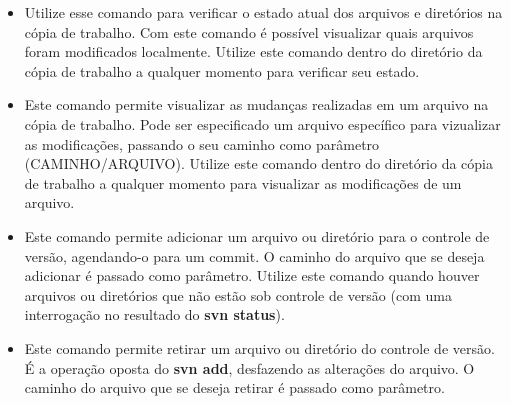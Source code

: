 \begin{itemize}
 \item \colorbox{PineGreen}{
	\begin{minipage}{.15\linewidth}
	\end{minipage}
	}
    
    \subitem Utilize esse comando para verificar o estado atual dos arquivos e diretórios na cópia de trabalho.
	     Com este comando é possível visualizar quais arquivos foram modificados localmente.
	     Utilize este comando dentro do diretório da cópia de trabalho a qualquer momento para verificar seu estado.

	     
\item \colorbox{PineGreen}{
	\begin{minipage}{.53\linewidth}
	\end{minipage}
	}
    
    \subitem Este comando permite visualizar as mudanças realizadas em um arquivo na cópia de trabalho.
	     Pode ser especificado um arquivo específico para vizualizar as modificações, passando o seu caminho como
	     parâmetro (CAMINHO/ARQUIVO).
	     Utilize este comando dentro do diretório da cópia de trabalho a qualquer momento para visualizar as modificações
	     de um arquivo.
    
\item \colorbox{PineGreen}{
	\begin{minipage}{.53\linewidth}
	\end{minipage}
	}
    
    \subitem Este comando permite adicionar um arquivo ou diretório para o controle de versão, agendando-o para um commit.
	     O caminho do arquivo que se deseja adicionar é passado como parâmetro.
	     Utilize este comando quando houver arquivos ou diretórios que não estão sob controle de versão 
	     (com uma interrogação no resultado do \textbf{svn status}).
    
\item \colorbox{PineGreen}{
	\begin{minipage}{.57\linewidth}
	\end{minipage}
	}
    
    \subitem Este comando permite retirar um arquivo ou diretório do controle de versão.
	     É a operação oposta do \textbf{svn add}, desfazendo as alterações do arquivo.
	     O caminho do arquivo que se deseja retirar é passado como parâmetro.


\end{itemize}
